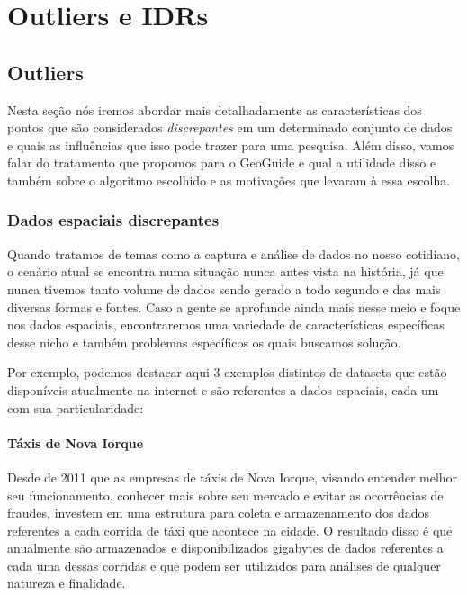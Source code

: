 \chapter{Outliers e IDRs}

\section{Outliers}

Nesta seção nós iremos abordar mais detalhadamente as características dos pontos que são considerados \textit{discrepantes} em um determinado conjunto de dados e quais as influências que isso pode trazer para uma pesquisa. Além disso, vamos falar do tratamento que propomos para o GeoGuide e qual a utilidade disso e também sobre o algoritmo escolhido e as motivações que levaram à essa escolha.

\subsection{Dados espaciais discrepantes}

Quando tratamos de temas como a captura e análise de dados no nosso cotidiano, o cenário atual se encontra numa situação nunca antes vista na história, já que nunca tivemos tanto volume de dados sendo gerado a todo segundo e das mais diversas formas e fontes. Caso a gente se aprofunde ainda mais nesse meio e foque nos dados espaciais, encontraremos uma variedade de características específicas desse nicho e também problemas específicos os quais buscamos solução.

Por exemplo, podemos destacar aqui 3 exemplos distintos de datasets que estão disponíveis atualmente na internet e são referentes a dados espaciais, cada um com sua particularidade:

\subsubsection{Táxis de Nova Iorque}

Desde de 2011 que as empresas de táxis de Nova Iorque, visando entender melhor seu funcionamento, conhecer mais sobre seu mercado e evitar as ocorrências de fraudes, investem em uma estrutura para coleta e armazenamento dos dados referentes a cada corrida de táxi que acontece na cidade. O resultado disso é que anualmente são armazenados e disponibilizados gigabytes de dados referentes a cada uma dessas corridas e que podem ser utilizados para análises de qualquer natureza e finalidade.


